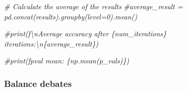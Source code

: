 \documentclass[
]{article}
\newenvironment{Shaded}{\begin{snugshade}}{\end{snugshade}}
\newcommand{\CommentTok}[1]{\textcolor[rgb]{0.56,0.35,0.01}{\textit{#1}}}
\begin{document}
\begin{Shaded}
\begin{Highlighting}[]
\CommentTok{\# Calculate the average of the results}
\CommentTok{\#average\_result = pd.concat(results).groupby(level=0).mean()}

\CommentTok{\#print(f\textquotesingle{}\textbackslash{}nAverage accuracy after \{num\_iterations\} iterations:\textbackslash{}n\{average\_result\}\textquotesingle{})}

\CommentTok{\#print(f\textquotesingle{}pval mean: \{np.mean(p\_vals)\}\textquotesingle{})}
\end{Highlighting}
\end{Shaded}

\subsubsection{Balance debates}\label{balance-debates}
\end{document}
